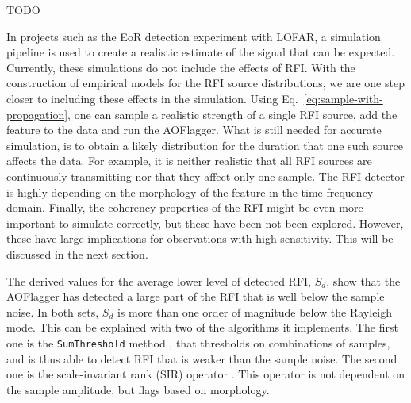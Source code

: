 \documentclass[useAMS,usenatbib]{mn2e}
\begin{document}
\citet{lf-interference-temperature-rogers} TODO

In projects such as the EoR detection experiment with LOFAR, a simulation pipeline is used to create a realistic estimate of the signal that can be expected. Currently, these simulations do not include the effects of RFI. With the construction of empirical models for the RFI source distributions, we are one step closer to including these effects in the simulation. Using Eq.~\eqref{eq:sample-with-propagation}, one can sample a realistic strength of a single RFI source, add the feature to the data and run the AOFlagger. What is still needed for accurate simulation, is to obtain a likely distribution for the duration that one such source affects the data. For example, it is neither realistic that all RFI sources are continuously transmitting nor that they affect only one sample. The RFI detector is highly depending on the morphology of the feature in the time-frequency domain. Finally, the coherency properties of the RFI might be even more important to simulate correctly, but these have been not been explored. However, these have large implications for observations with high sensitivity. This will be discussed in the next section. 

The derived values for the average lower level of detected RFI, $S_d$, show that the AOFlagger has detected a large part of the RFI that is well below the sample noise. In both sets, $S_d$ is more than one order of magnitude below the Rayleigh mode. This can be explained with two of the algorithms it implements. The first one is the {\tt SumThreshold} method \citep{post-correlation-rfi-classification}, that thresholds on combinations of samples, and is thus able to detect RFI that is weaker than the sample noise. The second one is the scale-invariant rank (SIR) operator \citep{scale-invariant-rank-operator}. This operator is not dependent on the sample amplitude, but flags based on morphology.
\end{document}
